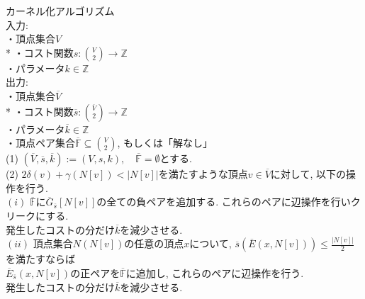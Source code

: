 \documentclass[10.5,a4paper,titlepage, dvipdfmx]{bxjsarticle}
\begin{document}
\begin{screen}
    $\textbf{カーネル化アルゴリズム}$ \\
    入力: \\
    \hspace{15pt} ・頂点集合$V$ \\*
    \hspace{15pt} ・コスト関数$s:\binom{V}{2} \rightarrow \mathbb{Z}$ \\
    \hspace{15pt} ・パラメータ$k\in\mathbb{Z}$\\
    出力: \\
    \hspace{15pt} ・頂点集合$\overline{V}$\\*
    \hspace{15pt} ・コスト関数$\overline{s}:\binom{\overline{V}}{2} \rightarrow \mathbb{Z}$\\
    \hspace{15pt} ・パラメータ$\overline{k}\in\mathbb{Z}$\\
    \hspace{15pt} ・頂点ペア集合$\overline{\mathbb{F}} \subseteq \binom{V}{2}$, もしくは「解なし」\\
    (1) $(\overline{V},\overline{s},\overline{k}) := (V,s,k), \quad \overline{\mathbb{F}} = \emptyset$とする.\\
    (2) $2\delta(v)+\gamma(N[v])<|N[v]|$を満たすような頂点$v \in \overline{V}$に対して, 以下の操作を行う.\\
    \hspace{15pt} $(i)$ $\overline{\mathbb{F}}$に$\overline{G}_{\overline{s}}[N[v]]$の全ての負ペアを追加する. これらのペアに辺操作を行いクリークにする.\\
    \hspace{15pt}\hspace{15pt} 発生したコストの分だけ$\overline{k}$を減少させる.\\
    \hspace{15pt}$(ii)$ 頂点集合$N(N[v])$の任意の頂点$x$について, $\overline{s}(\overline{E}(x,N[v])) \le \frac{|N[v]|}{2}$を満たすならば\\
    \hspace{15pt}\hspace{15pt} $\overline{E}_{\overline{s}}(x,N[v])$の正ペアを$\mathbb{\overline{F}}$に追加し, これらのペアに辺操作を行う.\\
    \hspace{15pt}\hspace{15pt} 発生したコストの分だけ$\overline{k}$を減少させる.\\

\end{screen}
\end{document}
